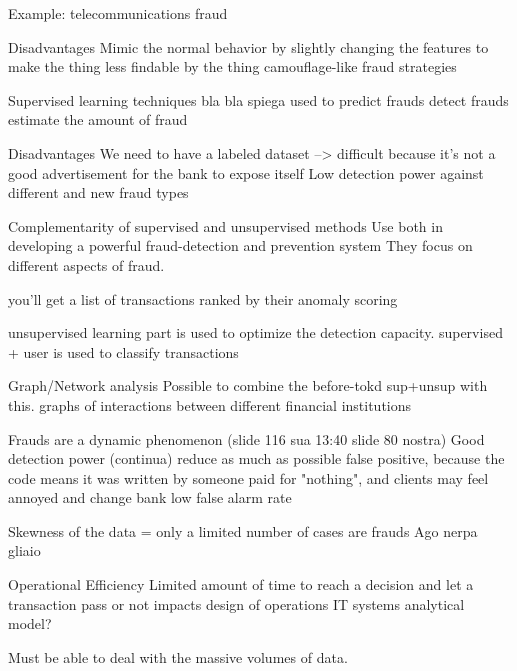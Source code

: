     Example: telecommunications fraud 

Disadvantages 
    Mimic the normal behavior by slightly changing the features to make the thing less findable by the thing 
    camouflage-like fraud strategies 

Supervised learning techniques 
    bla bla spiega 
    used to 
    predict frauds
    detect frauds 
    estimate the amount of fraud 

Disadvantages 
    We need to have a labeled dataset --> difficult because it's not a good advertisement for the bank to expose itself 
    Low detection power against different and new fraud types 

Complementarity of supervised and unsupervised methods 
    Use both in developing a powerful fraud-detection and prevention system 
    They focus on different aspects of fraud.

    you'll get a list of transactions ranked by their anomaly scoring 

    unsupervised learning part is used to optimize the detection capacity.
    supervised + user is used to classify transactions 

Graph/Network analysis 
    Possible to combine the before-tokd sup+unsup with this.
    graphs of interactions between different financial institutions 

Frauds are a dynamic phenomenon (slide 116 sua 13:40 slide 80 nostra)
Good detection power (continua)
    reduce as much as possible false positive, because the code means it was written by someone paid for "nothing", and clients may feel annoyed and change bank 
    low false alarm rate

Skewness of the data = only a limited number of cases are frauds 
Ago nerpa gliaio

Operational Efficiency 
    Limited amount of time to reach a decision and let a transaction pass or not 
        impacts design of operations IT systems 
        analytical model?

    Must be able to deal with the massive volumes of data.

        
